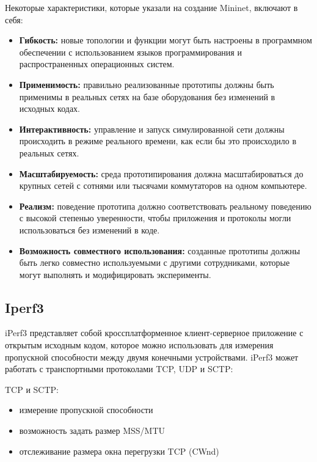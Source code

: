 Некоторые характеристики, которые указали на создание Mininet, включают в себя:

\begin{itemize}
  \item \textbf{Гибкость:} новые топологии и функции могут быть настроены в программном обеспечении с использованием языков программирования и распространенных операционных систем.
  
  \item \textbf{Применимость:} правильно реализованные прототипы должны быть применимы в реальных сетях на базе оборудования без изменений в исходных кодах.
  
  \item \textbf{Интерактивность:} управление и запуск симулированной сети должны происходить в режиме реального времени, как если бы это происходило в реальных сетях.
  
  \item \textbf{Масштабируемость:} среда прототипирования должна масштабироваться до крупных сетей с сотнями или тысячами коммутаторов на одном компьютере.
  
  \item \textbf{Реализм:} поведение прототипа должно соответствовать реальному поведению с высокой степенью уверенности, чтобы приложения и протоколы могли использоваться без изменений в коде.
  
  \item \textbf{Возможность совместного использования:} созданные прототипы должны быть легко совместно используемыми с другими сотрудниками, которые могут выполнять и модифицировать эксперименты.
\end{itemize}

\subsection{Iperf3}

iPerf3 представляет собой кроссплатформенное клиент-серверное приложение с открытым исходным кодом,
которое можно использовать для измерения пропускной способности между
двумя конечными устройствами. iPerf3 может работать с транспортными протоколами TCP, UDP и SCTP:

TCP и SCTP:

\begin{itemize}

\item измерение пропускной способности
\item возможность задать размер MSS/MTU
\item отслеживание размера окна перегрузки TCP (CWnd)

\end{itemize}

